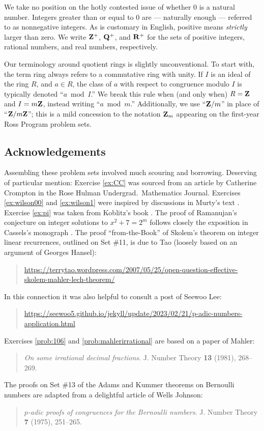 We take no position on the hotly contested issue of whether $0$ is a \textsf{natural number}. Integers greater than or equal to $0$ are --- naturally enough --- referred to as \textsf{nonnegative integers}. As is customary in English, \textsf{positive} means \emph{strictly} larger than zero. We write $\mathbf{Z}^{+}$, $\mathbf{Q}^{+}$, and $\mathbf{R}^{+}$ for the sets of positive integers, rational numbers, and real numbers, respectively.

Our terminology around quotient rings is slightly unconventional. To start with, the term \textsf{ring} always refers to a commutative ring with unity. If $I$ is an ideal of the ring $R$, and $a\in R$, the class of $a$ with respect to congruence modulo $I$ is typically denoted ``$a\bmod{I}$.'' We break this rule when (and only when) $R=\mathbf{Z}$ and $I=m\mathbf{Z}$, instead writing ``$a\bmod{m}$.'' Additionally, we use ``$\mathbf{Z}/m$'' in place of ``$\mathbf{Z}/m\mathbf{Z}$''; this is a mild concession to the notation $\mathbf{Z}_m$ appearing on the first-year Ross Program problem sets.

\subsection*{Acknowledgements}
Assembling these problem sets involved much scouring and borrowing. Deserving of particular mention:  Exercise \ref{ex:CC} was sourced from an article by Catherine Crompton in the Rose Hulman Undergrad.\ Mathematics Journal. Exercises \ref{ex:wilson00} and \ref{ex:wilson1} were inspired by discussions in Murty's text \cite{murty}. Exercise \ref{ex:pi} was taken from Koblitz's book \cite{koblitz}. The proof of Ramanujan's conjecture on integer solutions to $x^2+7=2^m$ follows closely the exposition in Cassels's monograph \cite{cassels86}. The proof ``from-the-Book'' of Skolem's theorem on integer linear recurrences, outlined on Set \#11, is due to Tao (loosely based on an argument of Georges Hansel): 
\begin{quote}\url{https://terrytao.wordpress.com/2007/05/25/open-question-effective-skolem-mahler-lech-theorem/}\end{quote}
In this connection it was also helpful to consult a post of Seewoo Lee:
\begin{quote} \url{https://seewoo5.github.io/jekyll/update/2023/02/21/p-adic-numbers-application.html}
\end{quote}
Exercises \ref{prob:106} and \ref{prob:mahlerirrational} are based on a paper of Mahler:
\begin{quote} \emph{On some irrational decimal fractions}.
J. Number Theory \textbf{13} (1981), 268--269.
\end{quote}
The proofs on Set \#13 of the Adams and Kummer theorems on Bernoulli numbers are adapted from a delightful article of Wells Johnson:
\begin{quote}
\emph{$p$-adic proofs of congruences for the Bernoulli numbers}. J. Number Theory \textbf{7} (1975), 251--265.
\end{quote}


